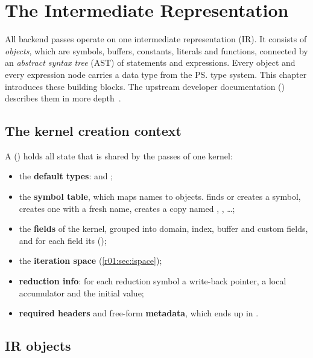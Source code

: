 \chapter{The Intermediate Representation}\label{r01:ch:ir}

All backend passes operate on one intermediate representation (IR). It consists of
\emph{objects}, which are symbols, buffers, constants, literals and functions, connected
by an \emph{abstract syntax tree} (AST) of statements and expressions. Every object and
every expression node carries a data type from the \ps{} type system. This chapter
introduces these building blocks. The upstream developer documentation
() describes them in more depth~\cite{pystencils-docs}.

\section{The kernel creation context}

A  () holds all state
that is shared by the passes of one kernel:
\begin{itemize}
  \item the \textbf{default types}:  and ;
  \item the \textbf{symbol table}, which maps names to  objects.
         finds or creates a symbol,
         creates one with a fresh name,
         creates a copy named , , \dots;
  \item the \textbf{fields} of the kernel, grouped into domain, index, buffer and custom
        fields, and for each field its  ();
  \item the \textbf{iteration space} (\cref{r01:sec:ispace});
  \item \textbf{reduction info}: for each reduction symbol a write-back pointer, a local
        accumulator and the initial value;
  \item \textbf{required headers} and free-form \textbf{metadata}, which ends up in
        .
\end{itemize}


\section{IR objects}

